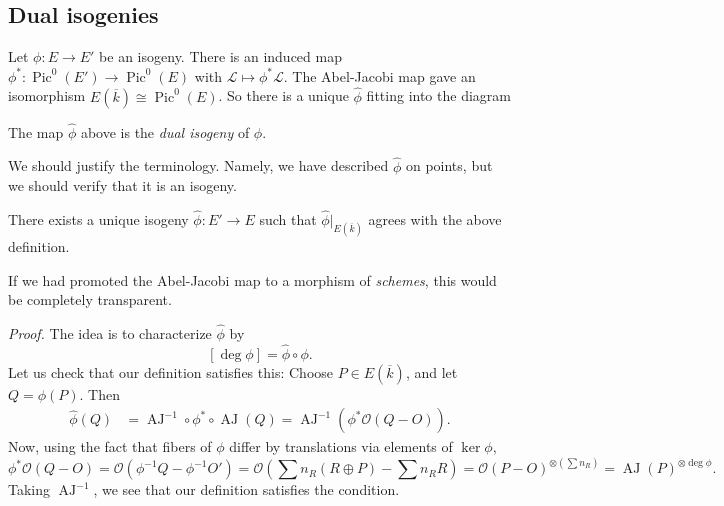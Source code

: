 \subsection{Dual isogenies}
Let \( \phi \colon E \to E' \) be an isogeny. There is an induced map \( \phi^* \colon \operatorname{Pic}^0(E') \to \operatorname{Pic}^0(E) \) with \( \mathcal{L} \mapsto \phi^* \mathcal{L} \).
The Abel-Jacobi map gave an isomorphism \( E( \overline{k} ) \cong \operatorname{Pic}^0(E) \).
So there is a unique \( \hat{\phi} \) fitting into the diagram
\begin{definition}
  The map \( \hat{\phi} \) above is the \textit{dual isogeny} of \( \phi \).
\end{definition}
We should justify the terminology.
Namely, we have described \( \hat{\phi} \) on points, but we should verify that it is an isogeny.
\begin{proposition}
  There exists a unique isogeny \( \hat{\phi} \colon E' \to E \) such that \( \hat{\phi}|_{E(\overline{k})} \) agrees with the above definition.
\end{proposition}
\begin{remark}
  If we had promoted the Abel-Jacobi map to a morphism of \textit{schemes}, this would be completely transparent.
\end{remark}
\textit{Proof.}
The idea is to characterize \( \hat{\phi} \) by
\[ [ \deg \phi ] = \hat{\phi} \circ \phi . \]
Let us check that our definition satisfies this:
Choose \( P \in E(\overline{k}) \), and let \( Q = \phi(P) \).
Then
\begin{align*}
 \hat{\phi}(Q) & = \operatorname{AJ}^{-1} \circ \phi^* \circ \operatorname{AJ}(Q)  = \operatorname{AJ}^{-1} \left( \phi^* \mathcal{O}(Q-O) \right).
\end{align*}
Now, using the fact that fibers of \( \phi \) differ by translations via elements of \( \ker \phi \),
\[ \phi^* \mathcal{O}(Q-O)
  = \mathcal{O}(\phi^{-1} Q - \phi^{-1} O' ) = \mathcal{O} ( \sum n_R (R \oplus P) - \sum n_R R )
  = \mathcal{O}(P-O)^{\otimes (\sum n_R )}
 = \operatorname{AJ}(P)^{\otimes \operatorname{deg} \phi} . \]
Taking \( \operatorname{AJ}^{-1} \), we see that our definition satisfies the condition.

